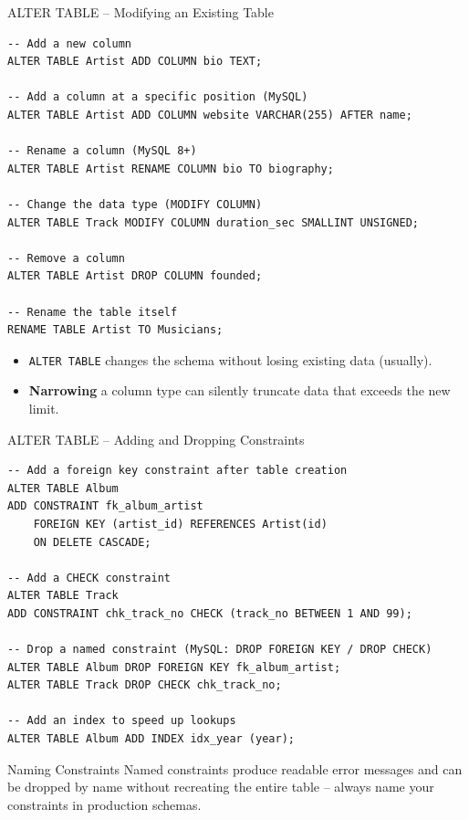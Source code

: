 \begin{frame}[fragile]{ALTER TABLE -- Modifying an Existing Table}
  \begin{lstlisting}[style=sqlstyle]
-- Add a new column
ALTER TABLE Artist ADD COLUMN bio TEXT;

-- Add a column at a specific position (MySQL)
ALTER TABLE Artist ADD COLUMN website VARCHAR(255) AFTER name;

-- Rename a column (MySQL 8+)
ALTER TABLE Artist RENAME COLUMN bio TO biography;

-- Change the data type (MODIFY COLUMN)
ALTER TABLE Track MODIFY COLUMN duration_sec SMALLINT UNSIGNED;

-- Remove a column
ALTER TABLE Artist DROP COLUMN founded;

-- Rename the table itself
RENAME TABLE Artist TO Musicians;
  \end{lstlisting}

  \begin{itemize}
    \item \texttt{ALTER TABLE} changes the schema without losing existing data (usually).
    \item \textbf{Narrowing} a column type can silently truncate data that exceeds the new limit.
  \end{itemize}
\end{frame}

\begin{frame}[fragile]{ALTER TABLE -- Adding and Dropping Constraints}
  \begin{lstlisting}[style=sqlstyle]
-- Add a foreign key constraint after table creation
ALTER TABLE Album
ADD CONSTRAINT fk_album_artist
    FOREIGN KEY (artist_id) REFERENCES Artist(id)
    ON DELETE CASCADE;

-- Add a CHECK constraint
ALTER TABLE Track
ADD CONSTRAINT chk_track_no CHECK (track_no BETWEEN 1 AND 99);

-- Drop a named constraint (MySQL: DROP FOREIGN KEY / DROP CHECK)
ALTER TABLE Album DROP FOREIGN KEY fk_album_artist;
ALTER TABLE Track DROP CHECK chk_track_no;

-- Add an index to speed up lookups
ALTER TABLE Album ADD INDEX idx_year (year);
  \end{lstlisting}

  \begin{block}{Naming Constraints}
    Named constraints produce readable error messages and can be dropped by name without
    recreating the entire table -- always name your constraints in production schemas.
  \end{block}
\end{frame}

